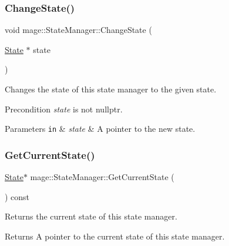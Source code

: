 \subsubsection{\texorpdfstring{Change\+State()}{ChangeState()}\hspace{0.1cm}{\footnotesize\ttfamily [2/2]}}
{\footnotesize\ttfamily void mage\+::\+State\+Manager\+::\+Change\+State (\begin{DoxyParamCaption}\item[{\hyperlink{classmage_1_1_state}{State} $\ast$}]{state }\end{DoxyParamCaption})\hspace{0.3cm}{\ttfamily [protected]}}

Changes the state of this state manager to the given state.

\begin{DoxyPrecond}{Precondition}
{\itshape state} is not {\ttfamily nullptr}. 
\end{DoxyPrecond}

\begin{DoxyParams}[1]{Parameters}
\mbox{\tt in}  & {\em state} & A pointer to the new state. \\
\hline
\end{DoxyParams}
\hypertarget{classmage_1_1_state_manager_ab3a37b1ef0d2e9960ff4c98747c64d3f}{}\label{classmage_1_1_state_manager_ab3a37b1ef0d2e9960ff4c98747c64d3f} 
\subsubsection{\texorpdfstring{Get\+Current\+State()}{GetCurrentState()}}
{\footnotesize\ttfamily \hyperlink{classmage_1_1_state}{State}$\ast$ mage\+::\+State\+Manager\+::\+Get\+Current\+State (\begin{DoxyParamCaption}{ }\end{DoxyParamCaption}) const}

Returns the current state of this state manager.

\begin{DoxyReturn}{Returns}
A pointer to the current state of this state manager. 
\end{DoxyReturn}
\hypertarget{classmage_1_1_state_manager_abd9c136e1a0f7e375450be5e50e2fc64}{}\label{classmage_1_1_state_manager_abd9c136e1a0f7e375450be5e50e2fc64} 
